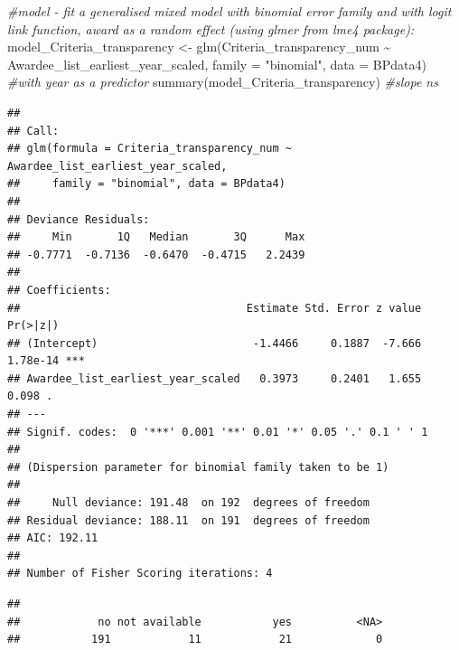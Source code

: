 \documentclass[
]{article}
\newenvironment{Shaded}{\begin{snugshade}}{\end{snugshade}}
\newcommand{\AttributeTok}[1]{\textcolor[rgb]{0.77,0.63,0.00}{#1}}
\newcommand{\CommentTok}[1]{\textcolor[rgb]{0.56,0.35,0.01}{\textit{#1}}}
\newcommand{\DocumentationTok}[1]{\textcolor[rgb]{0.56,0.35,0.01}{\textbf{\textit{#1}}}}
\newcommand{\FunctionTok}[1]{\textcolor[rgb]{0.00,0.00,0.00}{#1}}
\newcommand{\NormalTok}[1]{#1}
\newcommand{\OtherTok}[1]{\textcolor[rgb]{0.56,0.35,0.01}{#1}}
\newcommand{\SpecialCharTok}[1]{\textcolor[rgb]{0.00,0.00,0.00}{#1}}
\newcommand{\StringTok}[1]{\textcolor[rgb]{0.31,0.60,0.02}{#1}}
\begin{document}
\begin{Shaded}
\begin{Highlighting}[]
\CommentTok{\#model {-} fit a generalised mixed model with binomial error family and with logit link function, award as a random effect (using glmer from lme4 package):}
\NormalTok{model\_Criteria\_transparency }\OtherTok{\textless{}{-}} \FunctionTok{glm}\NormalTok{(Criteria\_transparency\_num }\SpecialCharTok{\textasciitilde{}}\NormalTok{ Awardee\_list\_earliest\_year\_scaled, }\AttributeTok{family =} \StringTok{"binomial"}\NormalTok{, }\AttributeTok{data =}\NormalTok{ BPdata4) }\CommentTok{\#with year as a predictor}
\FunctionTok{summary}\NormalTok{(model\_Criteria\_transparency) }\CommentTok{\#slope ns }
\end{Highlighting}
\end{Shaded}

\begin{verbatim}
## 
## Call:
## glm(formula = Criteria_transparency_num ~ Awardee_list_earliest_year_scaled, 
##     family = "binomial", data = BPdata4)
## 
## Deviance Residuals: 
##     Min       1Q   Median       3Q      Max  
## -0.7771  -0.7136  -0.6470  -0.4715   2.2439  
## 
## Coefficients:
##                                   Estimate Std. Error z value Pr(>|z|)    
## (Intercept)                        -1.4466     0.1887  -7.666 1.78e-14 ***
## Awardee_list_earliest_year_scaled   0.3973     0.2401   1.655    0.098 .  
## ---
## Signif. codes:  0 '***' 0.001 '**' 0.01 '*' 0.05 '.' 0.1 ' ' 1
## 
## (Dispersion parameter for binomial family taken to be 1)
## 
##     Null deviance: 191.48  on 192  degrees of freedom
## Residual deviance: 188.11  on 191  degrees of freedom
## AIC: 192.11
## 
## Number of Fisher Scoring iterations: 4
\end{verbatim}

\begin{Shaded}
\end{Shaded}

\begin{verbatim}
## 
##            no not available           yes          <NA> 
##           191            11            21             0
\end{verbatim}
\end{document}
